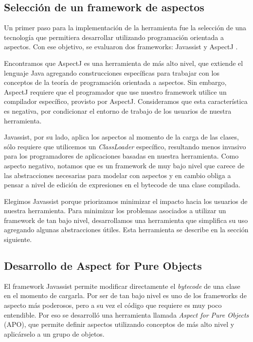 
\subsection{Selección de un framework de aspectos}  
		Un primer paso para la implementación de la herramienta fue la selección de una
		tecnología que permitiera desarrollar utilizando programación orientada a
		aspectos.
		Con ese objetivo, se evaluaron dos frameworks: Javassist
		\cite{chiba00loadtime} y AspectJ \cite{KiczalesHHKPG01}.
	
	\medskip 
	Encontramos que AspectJ es una herramienta de más alto nivel, que extiende
	el lenguaje Java agregando construcciones específicas para trabajar con
	los conceptos de la teoría de programación orientada a aspectos.
	Sin embargo, AspectJ requiere que el programador que use nuestro framework
	utilice un compilador específico, provisto por AspectJ. 
	Consideramos que esta característica es negativa, por condicionar el
	entorno de trabajo de los usuarios de nuestra herramienta.
	
	Javassist, por su lado, aplica los aspectos al momento de
	la carga de las clases, sólo requiere que utilicemos un \emph{ClassLoader}
	específico, resultando menos invasivo para los programadores de aplicaciones
	basadas en nuestra herramienta.
	Como aspecto negativo, notamos que es un framework de muy bajo nivel que
	carece de las abstracciones necesarias para modelar con aspectos y en cambio
	obliga a pensar a nivel de edición de expresiones en el bytecode de una clase
	compilada.
	
	Elegimos Javassist porque priorizamos minimizar el impacto hacia los usuarios
	de nuestra herramienta.
	Para minimizar los problemas asociados a utilizar un framework de tan bajo
	nivel, desarrollamos una herramienta que simplifica su uso agregando algunas
	abstracciones útiles. Esta herramienta se describe en la sección siguiente.

\subsection{Desarrollo de Aspect for Pure Objects}
	El framework Javassist permite modificar directamente el \emph{bytecode} de
	una clase en el momento de cargarla.
	Por ser de tan bajo nivel es uno de los frameworks de aspecto más poderosos,
	pero a su vez el código que requiere es muy poco entendible.
	Por eso se desarrolló una herramienta llamada \emph{Aspect for Pure Objects} (APO), 
	que permite definir aspectos utilizando conceptos de más alto nivel y
	aplicárselo a un grupo de objetos. 
	
